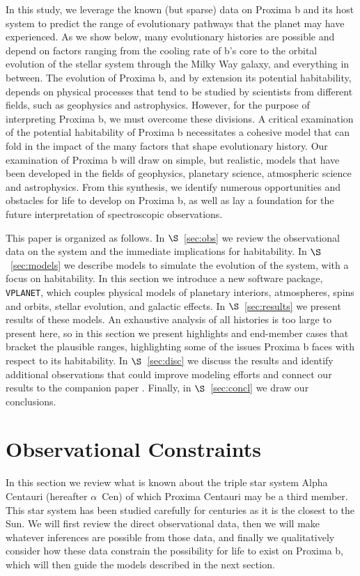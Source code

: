 \documentclass[preprint,12pt]{aastex}
\def\acen{{$\alpha$~Cen}}
\def\vplanet{\texttt{\footnotesize{VPLANET}}\xspace}
\begin{document}
In this study, we leverage the known (but sparse) data on Proxima b and
its host system to predict the range of evolutionary pathways that the
planet may have experienced. As we show below, many evolutionary histories are
possible and depend on factors ranging from the cooling rate of b's
core to the orbital evolution of the stellar system through the Milky
Way galaxy, and everything in between. The evolution of Proxima b, and by
extension its potential habitability, depends on physical processes
that tend to be studied by scientists from different
fields, such as geophysics and astrophysics. However, for the purpose
of interpreting Proxima b, we must overcome these divisions. A critical examination of the potential habitability of Proxima b necessitates
a cohesive model that can fold in the impact of the many factors that shape evolutionary
history. Our examination of Proxima b will draw on simple, but realistic, models
that have been developed in the fields of geophysics, planetary
science, atmospheric science and astrophysics. From this synthesis, we
identify numerous opportunities and obstacles for life to develop on
Proxima b, as well as lay a foundation for the future interpretation
of spectroscopic observations.

This paper is organized as follows. In $\S$~\ref{sec:obs} we review
the observational data on the system and the immediate implications
for habitability. In $\S$~\ref{sec:models} we describe models to
simulate the evolution of the system, with a focus on habitability. In
this section we introduce a new software package, \vplanet, which
couples physical models of planetary interiors, atmospheres, spins and
orbits, stellar evolution, and galactic effects. In
$\S$~\ref{sec:results} we present results of these models. An
exhaustive analysis of all histories is too large to present here, so
in this section we present highlights and end-member cases that
bracket the plausible ranges, highlighting some of the issues Proxima b faces with respect to its habitability. In $\S$~\ref{sec:disc} we discuss the
results and identify additional observations that could improve
modeling efforts and connect our results to the companion paper
\citep{Meadows16}. Finally, in $\S$~\ref{sec:concl} we draw our
conclusions.

\section{Observational Constraints \label{sec:obs}}

In this section we review what is known about the triple star system
Alpha Centauri (hereafter \acen) of which Proxima Centauri may be a
third member. This star system has been studied carefully for centuries as
it is the closest to the Sun. We will first review the direct
observational data, then we will make whatever inferences are possible
from those data, and finally we qualitatively consider how these data
constrain the possibility for life to exist on Proxima b, which will
then guide the models described in the next section.
\end{document}
